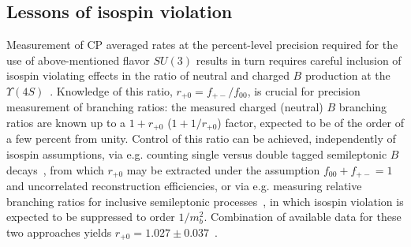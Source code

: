 \subsection{Lessons of isospin violation}
Measurement of CP averaged rates at the percent-level precision required for the use of above-mentioned flavor $SU(3)$ results \cite{Jung:2012mp, Ligeti:2015yma} in turn requires careful inclusion of isospin violating effects in the ratio of neutral and charged $B$ production at the $\Upsilon(4S)$~\cite{Jung:2015yma}. Knowledge of this ratio, $r_{+0} = f_{+-}/f_{00}$, is crucial for precision measurement of branching ratios:  the measured charged (neutral) $B$ branching ratios are known up to a $1 + r_{+0}$ ($1 + 1/r_{+0}$) factor, expected to be of the order of a few percent from unity. Control of this ratio can be achieved, independently of isospin assumptions, via e.g. counting single versus double tagged semileptonic $B$ decays~\cite{Aubert:2005bq}, from which $r_{+0}$ may be extracted under the assumption $f_{00} + f_{+-} = 1$ and uncorrelated reconstruction efficiencies, or via e.g. measuring relative branching ratios for inclusive semileptonic processes~\cite{Hastings:2002ff,HFAG}, in which isospin violation is expected to be suppressed to order $1/m_{b}^2$. Combination of available data for these two approaches yields $r_{+0} = 1.027 \pm 0.037$~\cite{Jung:2015yma}.

%

\endinput



%




